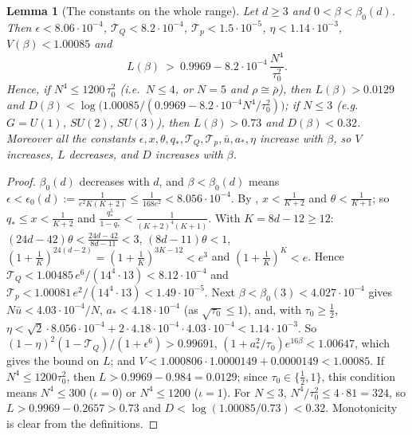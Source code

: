 \documentclass[11pt,a4paper]{article}
\newtheorem{lemma}[theorem]{Lemma}
\theoremstyle{definition}
\theoremstyle{remark}
\newcommand{\IIIlab}[2]{\cite[#1 \texttt{#2}]{III}}
\begin{document}
\begin{lemma}[The constants on the whole range]\label{mg:lem:range}
Let $d\ge3$ and $0<\beta<\beta_0(d)$. Then $\epsilon<8.06\cdot10^{-4}$, $\mathcal T_Q<8.2\cdot10^{-4}$, $\mathcal T_p<1.5\cdot10^{-5}$,
$\eta<1.14\cdot10^{-3}$, $V(\beta)<1.00085$ and
\[
L(\beta)\ >\ 0.9969-8.2\cdot10^{-4}\,\frac{N^4}{\tau_0^2} .
\]
Hence, if $N^4\le1200\,\tau_0^2$ (i.e.\ $N\le4$, or $N=5$ and $\rho\cong\bar\rho$), then $L(\beta)>0.0129$ and
$D(\beta)<\log\bigl(1.00085/(0.9969-8.2\cdot10^{-4}N^4/\tau_0^2)\bigr)$; if $N\le3$ (e.g.\ $G=U(1)$, $SU(2)$, $SU(3)$), then $L(\beta)>0.73$ and
$D(\beta)<0.32$. Moreover all the constants $\epsilon,x,\theta,q_*,\mathcal T_Q,\mathcal T_p,\bar u,a_*,\eta$ increase with $\beta$, so $V$ increases,
$L$ decreases, and $D$ increases with $\beta$.
\end{lemma}

\begin{proof}
$\beta_0(d)$ decreases with $d$, and $\beta<\beta_0(d)$ means $\epsilon<\epsilon_0(d):=\frac1{e^2K(K+2)}\le\frac1{168e^2}<8.056\cdot10^{-4}$. By
\IIIlab{Lemma}{al:lem:constants}, $x<\frac1{K+2}$ and $\theta<\frac1{K+1}$; so $q_*\le x<\frac1{K+2}$ and $\frac{q_*^5}{1-q_*}<\frac1{(K+2)^4(K+1)}$.
With $K=8d-12\ge12$: $(24d-42)\theta<\frac{24d-42}{8d-11}<3$, $(8d-11)\theta<1$, $(1+\frac1K)^{24(d-2)}=(1+\frac1K)^{3K-12}<e^3$ and
$(1+\frac1K)^K<e$. Hence $\mathcal T_Q<1.00485\,e^6/(14^4\cdot13)<8.12\cdot10^{-4}$ and $\mathcal T_p<1.00081\,e^2/(14^4\cdot13)<1.49\cdot10^{-5}$. Next
$\beta<\beta_0(3)<4.027\cdot10^{-4}$ gives $N\bar u<4.03\cdot10^{-4}/N$, $a_*<4.18\cdot10^{-4}$ (as $\sqrt{\tau_0}\le1$), and, with
$\tau_0\ge\frac12$, $\eta<\sqrt2\cdot8.056\cdot10^{-4}+2\cdot4.18\cdot10^{-4}\cdot4.03\cdot10^{-4}<1.14\cdot10^{-3}$. So
$(1-\eta)^2(1-\mathcal T_Q)/(1+\epsilon^6)>0.99691$, $(1+a_*^2/\tau_0)e^{16\beta}<1.00647$, which gives the bound on $L$; and
$V<1.000806\cdot1.0000149+0.0000149<1.00085$. If $N^4\le1200\tau_0^2$, then $L>0.9969-0.984=0.0129$; since $\tau_0\in\{\frac12,1\}$, this
condition means $N^4\le300$ ($\iota=0$) or $N^4\le1200$ ($\iota=1$). For $N\le3$, $N^4/\tau_0^2\le4\cdot81=324$, so $L>0.9969-0.2657>0.73$ and
$D<\log(1.00085/0.73)<0.32$. Monotonicity is clear from the definitions.
\end{proof}
\end{document}
